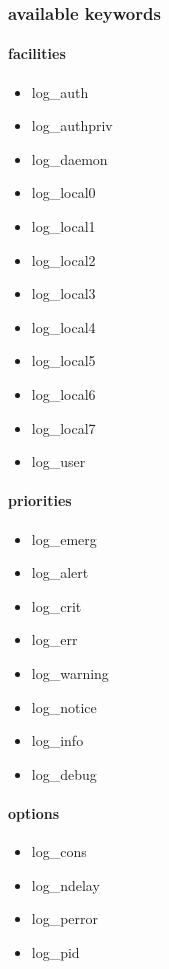 \documentclass[english]{report}
\begin{document}
\subsubsection{available keywords }


\paragraph{facilities }

\begin{itemize}
\item log\_auth 
\item log\_authpriv 
\item log\_daemon 
\item log\_local0 
\item log\_local1 
\item log\_local2 
\item log\_local3 
\item log\_local4 
\item log\_local5 
\item log\_local6 
\item log\_local7 
\item log\_user
\end{itemize}

\paragraph{priorities }

\begin{itemize}
\item log\_emerg 
\item log\_alert 
\item log\_crit 
\item log\_err 
\item log\_warning 
\item log\_notice 
\item log\_info 
\item log\_debug
\end{itemize}

\paragraph{options}

\begin{itemize}
\item log\_cons 
\item log\_ndelay 
\item log\_perror
\item log\_pid
\end{itemize}
\end{document}
